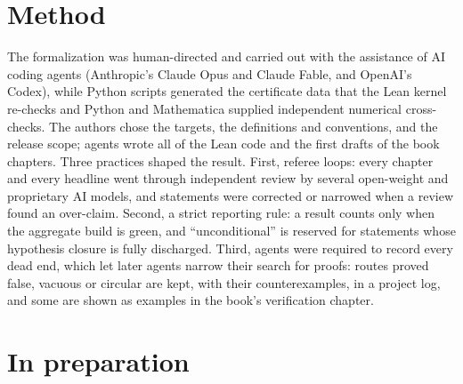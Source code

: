 \documentclass[10pt]{article}
\begin{document}
\section{Method}

The formalization was human-directed and carried out with the assistance of AI coding agents (Anthropic's
Claude Opus and Claude Fable, and OpenAI's Codex), while Python scripts generated the certificate data that the Lean
kernel re-checks and Python and Mathematica supplied independent numerical cross-checks. The authors chose the
targets, the definitions and conventions, and the release scope; agents wrote all of the Lean code and the first
drafts of the book chapters. Three practices shaped the result. First, referee loops: every chapter and every
headline went through independent review by several open-weight and proprietary AI models, and statements were
corrected or narrowed when a review found an over-claim. Second, a strict reporting rule: a result counts only when the aggregate build is green, and
``unconditional'' is reserved for statements whose hypothesis closure is fully discharged. Third, agents were required to record every dead
end, which let later agents narrow their search for proofs:
routes proved false, vacuous or circular are kept, with their counterexamples, in a project log, and some are shown as
examples in the book's verification chapter.

\section{In preparation}\label{sec:prep}
\end{document}
